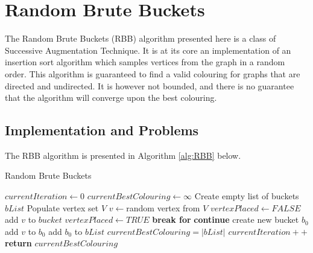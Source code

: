 \section{Random Brute Buckets}
The Random Brute Buckets (RBB) algorithm presented here is a class of Successive Augmentation Technique. It is at its core an implementation of an insertion sort algorithm which samples vertices from the graph in a random order. This algorithm is guaranteed to find a valid colouring for graphs that are directed and undirected. It is however not bounded, and there is no guarantee that the algorithm will converge upon the best colouring. 

\subsection{Implementation and Problems}
The RBB algorithm is presented in Algorithm \ref{alg:RBB} below.
\begin{algorithm}[H]
    \caption{Random Brute Buckets}
    \label{alg:RBB}
    \begin{algorithmic}[1] %
         			
			\State $currentIteration \gets 0$	
			\State $currentBestColouring \gets \infty$ \label{alg:RRB_initialColouring}
				\State Create empty list of buckets $bList$       
            		\State Populate vertex set $V$
                		\State $v \gets $random vertex from $V$ 
					\State $vertexPlaced \gets FALSE$                		
                				\State add $v$ to $bucket$
                				\State $vertexPlaced \gets TRUE$
                				\State \textbf{break for}
                			\Else \textbf{ continue}
                			\EndIf
                		\EndFor
                		 
                			\State create new bucket $b_0$
                			\State add $v$ to $b_0$
                			\State add $b_0$ to $bList$
                		\EndIf
                	\EndWhile
            			\State $currentBestColouring = |bList|$
            		\EndIf
            		\State $currentIteration++$
            \EndWhile
            \State \textbf{return} $currentBestColouring$
        \EndProcedure
    \end{algorithmic}
\end{algorithm}

